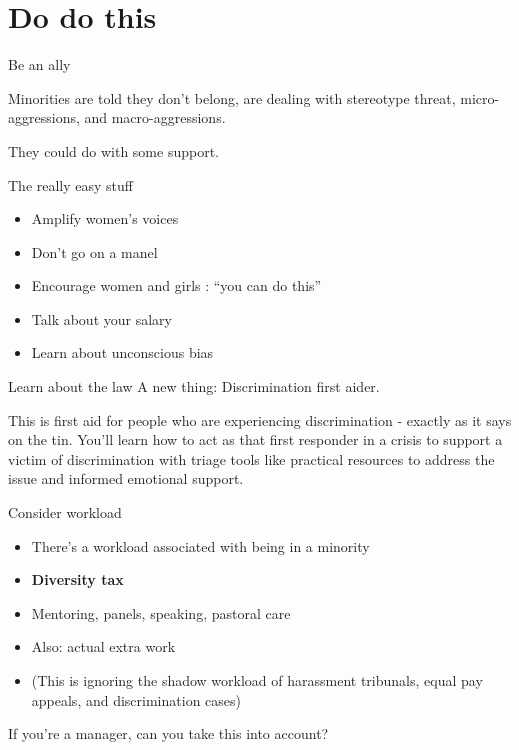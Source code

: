 \documentclass[xcolor=table,aspectratio=169]{beamer}
\begin{document}
\section{Do do this}

\begin{frame}{Be an ally}

	Minorities are told they don't belong, are dealing with stereotype threat, micro-aggressions, and macro-aggressions.

	\vspace{0.5em}

	They could do with some support.

\end{frame}
\begin{frame}{The really easy stuff}
	\begin{itemize}
		\item Amplify women's voices
		\item Don't go on a manel
		\item Encourage women and girls : ``you can do this''
		\item Talk about your salary
		\item Learn about unconscious bias
	\end{itemize}
\end{frame}
\begin{frame}{Learn about the law}
	A new thing: Discrimination first aider. 
	
	\vspace{0.5em}

	This is first aid for people who are experiencing discrimination - exactly as it says on the tin. You'll learn how to act as that first responder in a crisis to support a victim of discrimination with triage tools like practical resources to address the issue and informed emotional support.

	\vspace{0.5em}


\end{frame}

\begin{frame}{Consider workload}
	\begin{itemize}
		\item There's a workload associated with being in a minority
		\item \textbf{Diversity tax}
		\item Mentoring, panels, speaking, pastoral care
		\item Also: actual extra work 
		\item (This is ignoring the shadow workload of harassment tribunals, equal pay appeals, and discrimination cases)
	\end{itemize}
	If you're a manager, can you take this into account?  
\end{frame}
\end{document}

